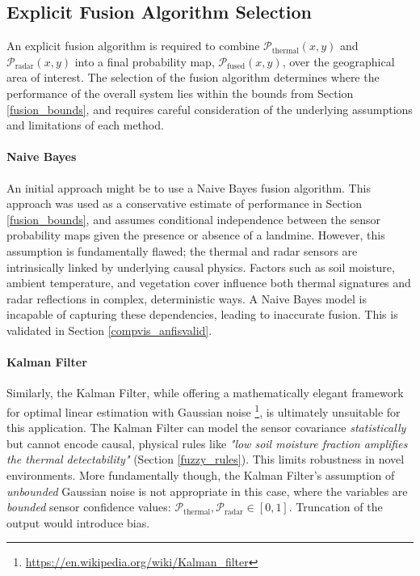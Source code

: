\subsection{Explicit Fusion Algorithm Selection}

        An explicit fusion algorithm is required to combine \(\mathcal{P}_\text{thermal}(x, y)\) and \(\mathcal{P}_\text{radar}(x, y)\) into a final probability map, \(\mathcal{P}_\text{fused}(x, y)\), over the geographical area of interest. The selection of the fusion algorithm determines where the performance of the overall system lies within the bounds from Section \ref{fusion_bounds}, and requires careful consideration of the underlying assumptions and limitations of each method.
    
    \paragraph{Naive Bayes}
    
        An initial approach might be to use a Naive Bayes fusion algorithm. This approach was used as a conservative estimate of performance in Section \ref{fusion_bounds}, and assumes conditional independence between the sensor probability maps given the presence or absence of a landmine. However, this assumption is fundamentally flawed; the thermal and radar sensors are intrinsically linked by underlying causal physics. Factors such as soil moisture, ambient temperature, and vegetation cover influence both thermal signatures and radar reflections in complex, deterministic ways. A Naive Bayes model is incapable of capturing these dependencies, leading to inaccurate fusion. This is validated in Section \ref{compvis_anfisvalid}.
    
    \paragraph{Kalman Filter}
    
        Similarly, the Kalman Filter, while offering a mathematically elegant framework for optimal linear estimation with Gaussian noise \footnote{\url{https://en.wikipedia.org/wiki/Kalman_filter}}, is ultimately unsuitable for this application. The Kalman Filter can model the sensor covariance \textit{statistically} but cannot encode causal, physical rules like \textit{"low soil moisture fraction amplifies the thermal detectability"} (Section \ref{fuzzy_rules}). This limits robustness in novel environments. More fundamentally though, the Kalman Filter's assumption of \textit{unbounded} Gaussian noise is not appropriate in this case, where the variables are \textit{bounded} sensor confidence values: \(\mathcal{P}_{\text{thermal}}, \mathcal{P}_{\text{radar}} \in [0,1]\). Truncation of the output would introduce bias.
    
